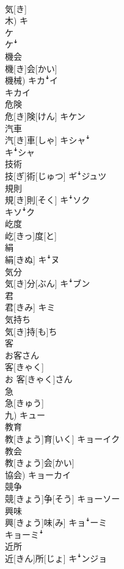 \documentclass[8pt]{extreport}
\begin{document}
\begin{CJK}{UTF8}{min}
\\	気[き] 
\\	木)	キ 
\\	ケ 
\\	ケꜜ
\\	機会	
\\	機[き]会[かい] 
\\	機械)	キカꜜイ 
\\	キカイ
\\	危険	
\\	危[き]険[けん]	キケン
\\	汽車	
\\	汽[き]車[しゃ]	キシャꜜ 
\\	キꜜシャ
\\	技術	
\\	技[ぎ]術[じゅつ]	ギꜜジュツ
\\	規則	
\\	規[き]則[そく]	キꜜソク 
\\	キソꜜク
\\	屹度	
\\	屹[きっ]度[と]	
\\	絹	
\\	絹[きぬ]	キꜜヌ
\\	気分	
\\	気[き]分[ぶん]	キꜜブン
\\	君	
\\	君[きみ]	キミ
\\	気持ち	
\\	気[き]持[も]ち	
\\	客 
\\	お客さん	
\\	客[きゃく] 
\\	お 客[きゃく]さん	
\\	急	
\\	急[きゅう] 
\\	九)	キュー
\\	教育	
\\	教[きょう]育[いく]	キョーイク
\\	教会	
\\	教[きょう]会[かい] 
\\	協会)	キョーカイ
\\	競争	
\\	競[きょう]争[そう]	キョーソー
\\	興味	
\\	興[きょう]味[み]	キョꜜーミ 
\\	キョーミꜜ
\\	近所	
\\	近[きん]所[じょ]	キꜜンジョ

\end{CJK}
\end{document}
